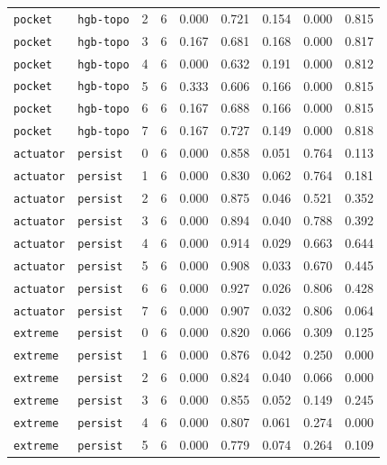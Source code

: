 \documentclass{article}
\begin{document}
\begin{center}
\begin{tabular}{lllcccccc}
\texttt{pocket} & \texttt{hgb-topo} & 2 & 6 & 0.000 & 0.721 & 0.154 & 0.000 & 0.815 \\
\texttt{pocket} & \texttt{hgb-topo} & 3 & 6 & 0.167 & 0.681 & 0.168 & 0.000 & 0.817 \\
\texttt{pocket} & \texttt{hgb-topo} & 4 & 6 & 0.000 & 0.632 & 0.191 & 0.000 & 0.812 \\
\texttt{pocket} & \texttt{hgb-topo} & 5 & 6 & 0.333 & 0.606 & 0.166 & 0.000 & 0.815 \\
\texttt{pocket} & \texttt{hgb-topo} & 6 & 6 & 0.167 & 0.688 & 0.166 & 0.000 & 0.815 \\
\texttt{pocket} & \texttt{hgb-topo} & 7 & 6 & 0.167 & 0.727 & 0.149 & 0.000 & 0.818 \\
\texttt{actuator} & \texttt{persist} & 0 & 6 & 0.000 & 0.858 & 0.051 & 0.764 & 0.113 \\
\texttt{actuator} & \texttt{persist} & 1 & 6 & 0.000 & 0.830 & 0.062 & 0.764 & 0.181 \\
\texttt{actuator} & \texttt{persist} & 2 & 6 & 0.000 & 0.875 & 0.046 & 0.521 & 0.352 \\
\texttt{actuator} & \texttt{persist} & 3 & 6 & 0.000 & 0.894 & 0.040 & 0.788 & 0.392 \\
\texttt{actuator} & \texttt{persist} & 4 & 6 & 0.000 & 0.914 & 0.029 & 0.663 & 0.644 \\
\texttt{actuator} & \texttt{persist} & 5 & 6 & 0.000 & 0.908 & 0.033 & 0.670 & 0.445 \\
\texttt{actuator} & \texttt{persist} & 6 & 6 & 0.000 & 0.927 & 0.026 & 0.806 & 0.428 \\
\texttt{actuator} & \texttt{persist} & 7 & 6 & 0.000 & 0.907 & 0.032 & 0.806 & 0.064 \\
\texttt{extreme} & \texttt{persist} & 0 & 6 & 0.000 & 0.820 & 0.066 & 0.309 & 0.125 \\
\texttt{extreme} & \texttt{persist} & 1 & 6 & 0.000 & 0.876 & 0.042 & 0.250 & 0.000 \\
\texttt{extreme} & \texttt{persist} & 2 & 6 & 0.000 & 0.824 & 0.040 & 0.066 & 0.000 \\
\texttt{extreme} & \texttt{persist} & 3 & 6 & 0.000 & 0.855 & 0.052 & 0.149 & 0.245 \\
\texttt{extreme} & \texttt{persist} & 4 & 6 & 0.000 & 0.807 & 0.061 & 0.274 & 0.000 \\
\texttt{extreme} & \texttt{persist} & 5 & 6 & 0.000 & 0.779 & 0.074 & 0.264 & 0.109 \\
\bottomrule
\end{tabular}
\end{center}
\end{document}
